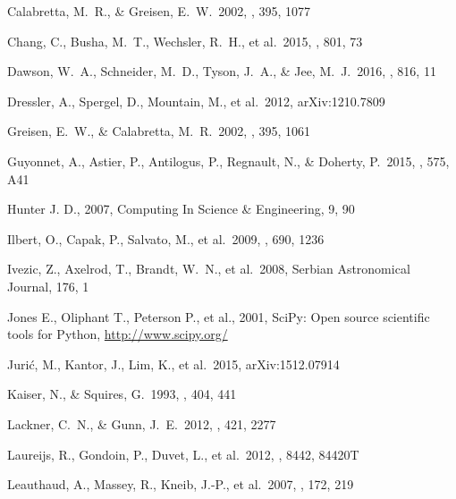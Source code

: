 \documentclass[useamsfonts]{pasj01}
\begin{document}
\begin{thebibliography}{}
     Calabretta, M.~R., \& Greisen, E.~W.\
             2002, \aap, 395, 1077
             
     Chang, C., Busha, M.~T., Wechsler, R.~H.,
             et al.\ 2015, \apj, 801, 73

     Dawson, W.~A., Schneider, M.~D., 
             Tyson, J.~A., \& Jee, M.~J.\ 2016, \apj, 816, 11 
             
     Dressler, A., Spergel, D., Mountain,
             M., et al.\ 2012, arXiv:1210.7809

     Greisen, E.~W., \& Calabretta, M.~R.\
             2002, \aap, 395, 1061

     Guyonnet, A., Astier, P., Antilogus, 
             P., Regnault, N., \& Doherty, P.\ 2015, \aap, 575, A41 
    
     Hunter J. D., 2007, Computing In Science \&
             Engineering, 9, 90

     Ilbert, O., Capak, P., Salvato,
             M., et al.\ 2009, \apj, 690, 1236

     Ivezic, Z., Axelrod, T., Brandt, W.~N.,
             et al.\ 2008, Serbian Astronomical Journal, 176, 1

     Jones E., Oliphant T., Peterson P., et al.,
             2001, SciPy: Open source scientific tools for Python,
             \url{http://www.scipy.org/}

     Juri{\'c}, M., Kantor, J., Lim, K.,
             et al.\ 2015, arXiv:1512.07914

     Kaiser, N., \& Squires, G.\
             1993, \apj, 404, 441

     Lackner, C.~N., \& Gunn, J.~E.\
             2012, \mnras, 421, 2277

     Laureijs, R., Gondoin, P., Duvet, L.,
             et al.\ 2012, \procspie, 8442, 84420T

     Leauthaud, A., Massey, R.,
             Kneib, J.-P., et al.\ 2007, \apjs, 172, 219


\end{thebibliography}
\end{document}
